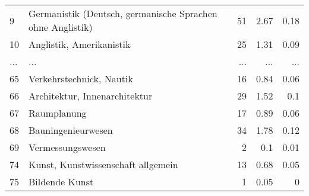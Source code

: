 \begin{longtable}{lXrrr}
        9 & \multicolumn{1}{X}{Germanistik (Deutsch, germanische Sprachen ohne Anglistik)} & %
          \num{51} &
          \num[round-mode=places,round-precision=2]{2,67} &
          \num[round-mode=places,round-precision=2]{0,18} \\
        10 & \multicolumn{1}{X}{Anglistik, Amerikanistik} & %
          \num{25} &
          \num[round-mode=places,round-precision=2]{1,31} &
          \num[round-mode=places,round-precision=2]{0,09} \\
       ... & ... & ... & ... & ... \\
        65 & \multicolumn{1}{X}{Verkehrstechnick, Nautik} & %
          \num{16} &
          \num[round-mode=places,round-precision=2]{0,84} &
          \num[round-mode=places,round-precision=2]{0,06} \\

        66 & \multicolumn{1}{X}{Architektur, Innenarchitektur} & %
          \num{29} &
          \num[round-mode=places,round-precision=2]{1,52} &
          \num[round-mode=places,round-precision=2]{0,1} \\

        67 & \multicolumn{1}{X}{Raumplanung} & %
          \num{17} &
          \num[round-mode=places,round-precision=2]{0,89} &
          \num[round-mode=places,round-precision=2]{0,06} \\

        68 & \multicolumn{1}{X}{Bauningenieurwesen} & %
          \num{34} &
          \num[round-mode=places,round-precision=2]{1,78} &
          \num[round-mode=places,round-precision=2]{0,12} \\

        69 & \multicolumn{1}{X}{Vermessungswesen} & %
          \num{2} &
          \num[round-mode=places,round-precision=2]{0,1} &
          \num[round-mode=places,round-precision=2]{0,01} \\

        74 & \multicolumn{1}{X}{Kunst, Kunstwissenschaft allgemein} & %
          \num{13} &
          \num[round-mode=places,round-precision=2]{0,68} &
          \num[round-mode=places,round-precision=2]{0,05} \\

        75 & \multicolumn{1}{X}{Bildende Kunst} & %
          \num{1} &
          \num[round-mode=places,round-precision=2]{0,05} &
          \num[round-mode=places,round-precision=2]{0} \\


\end{longtable}
